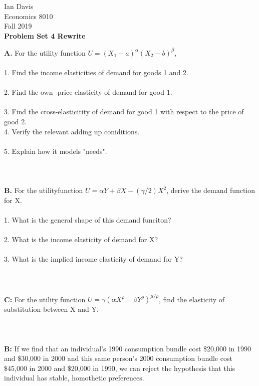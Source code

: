 \documentclass[11pt]{article}
\begin{document}
\begin{flushleft}
Ian Davis\\
Economics 8010\\
Fall 2019\\
\bigskip
\textbf{Problem Set 4 Rewrite}\\
\end{flushleft}
\textbf{A. } For the utility function $U = (X_1 - a)^\alpha (X_2 - b)^\beta$,\\
\\
1. Find the income elasticities of demand for goods 1 and 2.\\
\\
2. Find the own- price elasticity of demand for good 1.\\
\\
3. Find the cross-elasticitity of demand for good 1 with respect to the price of good 2. 
\\
4. Verify the relevant adding up coniditions.\\
\\
5. Explain how it models "needs".\\
\\
\\
\\
\textbf{B. }For the utilityfunction $U = \alpha Y + \beta X - (\gamma /2)X^2$, derive the demand function for X.\\
\\
1. What is the general shape of this demand funciton?\\
\\
2. What is the income elasticity of demand for X?\\
\\
3. What is the implied income elasticity of demand for Y?\\
\\
\\
\\
\textbf{C: }For the utility function $U = \gamma (\alpha X^\rho + \beta Y^\rho )^{\mu / \rho }$, find the elasticity of substitution between X and Y.\\
\\
\\
\\
\textbf{B: }If we find that an individual's 1990 consumption bundle cost \$20,000 in 1990 and \$30,000 in 2000 and this same person's 2000 consumption bundle cost \$45,000 in 2000 and \$20,000 in 1990, we can reject the hypothesis that this individual has stable, homothetic preferences. 
\end{document}
